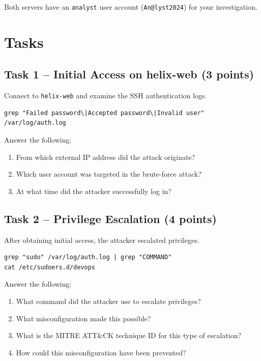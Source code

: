 \documentclass[a4paper, 12pt]{article}
\begin{document}
Both servers have an \texttt{analyst} user account (\texttt{An@lyst2024}) for your investigation.

\section{Tasks}

\subsection{Task 1 -- Initial Access on helix-web (3 points)}

Connect to \texttt{helix-web} and examine the SSH authentication logs.

\begin{lstlisting}
grep "Failed password\|Accepted password\|Invalid user" /var/log/auth.log
\end{lstlisting}

Answer the following:
\begin{enumerate}[label=\alph*)]
    \item From which external IP address did the attack originate?
    \item Which user account was targeted in the brute-force attack?
    \item At what time did the attacker successfully log in?
\end{enumerate}

\subsection{Task 2 -- Privilege Escalation (4 points)}

After obtaining initial access, the attacker escalated privileges.

\begin{lstlisting}
grep "sudo" /var/log/auth.log | grep "COMMAND"
cat /etc/sudoers.d/devops
\end{lstlisting}

Answer the following:
\begin{enumerate}[label=\alph*)]
    \item What command did the attacker use to escalate privileges?
    \item What misconfiguration made this possible?
    \item What is the MITRE ATT\&CK technique ID for this type of escalation?
    \item How could this misconfiguration have been prevented?
\end{enumerate}
\end{document}
